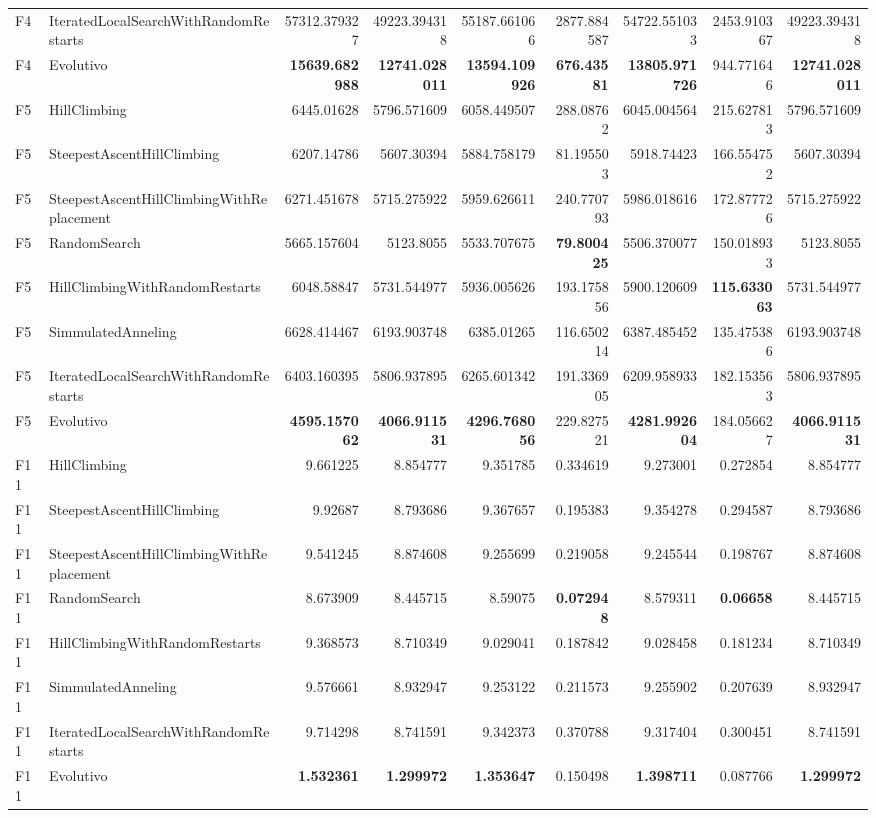 \begin{tabular}{llrrrrrrr}
F4 & IteratedLocalSearchWithRandomRestarts & 57312.379327 & 49223.394318 & 55187.661066 & 2877.884587 & 54722.551033 & 2453.910367 & 49223.394318 \\ 
F4 & Evolutivo & \textbf{15639.682988} & \textbf{12741.028011} & \textbf{13594.109926} & \textbf{676.43581} & \textbf{13805.971726} & 944.771646 & \textbf{12741.028011} \\ 
\midrule
F5 & HillClimbing & 6445.01628 & 5796.571609 & 6058.449507 & 288.08762 & 6045.004564 & 215.627813 & 5796.571609 \\ 
F5 & SteepestAscentHillClimbing & 6207.14786 & 5607.30394 & 5884.758179 & 81.195503 & 5918.74423 & 166.554752 & 5607.30394 \\ 
F5 & SteepestAscentHillClimbingWithReplacement & 6271.451678 & 5715.275922 & 5959.626611 & 240.770793 & 5986.018616 & 172.877726 & 5715.275922 \\ 
F5 & RandomSearch & 5665.157604 & 5123.8055 & 5533.707675 & \textbf{79.800425} & 5506.370077 & 150.018933 & 5123.8055 \\ 
F5 & HillClimbingWithRandomRestarts & 6048.58847 & 5731.544977 & 5936.005626 & 193.175856 & 5900.120609 & \textbf{115.633063} & 5731.544977 \\ 
F5 & SimmulatedAnneling & 6628.414467 & 6193.903748 & 6385.01265 & 116.650214 & 6387.485452 & 135.475386 & 6193.903748 \\ 
F5 & IteratedLocalSearchWithRandomRestarts & 6403.160395 & 5806.937895 & 6265.601342 & 191.336905 & 6209.958933 & 182.153563 & 5806.937895 \\ 
F5 & Evolutivo & \textbf{4595.157062} & \textbf{4066.911531} & \textbf{4296.768056} & 229.827521 & \textbf{4281.992604} & 184.056627 & \textbf{4066.911531} \\ 
\midrule
F11 & HillClimbing & 9.661225 & 8.854777 & 9.351785 & 0.334619 & 9.273001 & 0.272854 & 8.854777 \\ 
F11 & SteepestAscentHillClimbing & 9.92687 & 8.793686 & 9.367657 & 0.195383 & 9.354278 & 0.294587 & 8.793686 \\ 
F11 & SteepestAscentHillClimbingWithReplacement & 9.541245 & 8.874608 & 9.255699 & 0.219058 & 9.245544 & 0.198767 & 8.874608 \\ 
F11 & RandomSearch & 8.673909 & 8.445715 & 8.59075 & \textbf{0.072948} & 8.579311 & \textbf{0.06658} & 8.445715 \\ 
F11 & HillClimbingWithRandomRestarts & 9.368573 & 8.710349 & 9.029041 & 0.187842 & 9.028458 & 0.181234 & 8.710349 \\ 
F11 & SimmulatedAnneling & 9.576661 & 8.932947 & 9.253122 & 0.211573 & 9.255902 & 0.207639 & 8.932947 \\ 
F11 & IteratedLocalSearchWithRandomRestarts & 9.714298 & 8.741591 & 9.342373 & 0.370788 & 9.317404 & 0.300451 & 8.741591 \\ 
F11 & Evolutivo & \textbf{1.532361} & \textbf{1.299972} & \textbf{1.353647} & 0.150498 & \textbf{1.398711} & 0.087766 & \textbf{1.299972} \\ 
\bottomrule
\end{tabular}
